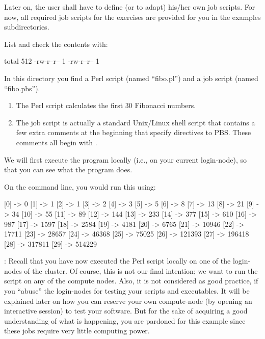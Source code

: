 Later on, the \hpc user shall have to define (or to adapt) his/her own
job scripts. For now, all required job scripts for the
exercises are provided for you in the examples subdirectories.

List and check the contents with:

\begin{prompt}
total 512
-rw-r--r-- 1 %
-rw-r--r-- 1 %
\end{prompt}

In this directory you find a Perl script (named ``fibo.pl'') and a job script
(named ``fibo.pbs'').

\begin{enumerate}
\item  The Perl script calculates the first 30 Fibonacci numbers.
\item  The job script is actually a standard Unix/Linux shell script that
  contains a few extra comments at the beginning that specify directives to
  PBS.  These comments all begin with .
\end{enumerate}

We will first execute the program locally (i.e., on your current login-node),
so that you can see what the program does.

On the command line, you would run this using:

\begin{prompt}
[0] -> 0
[1] -> 1
[2] -> 1
[3] -> 2
[4] -> 3
[5] -> 5
[6] -> 8
[7] -> 13
[8] -> 21
[9] -> 34
[10] -> 55
[11] -> 89
[12] -> 144
[13] -> 233
[14] -> 377
[15] -> 610
[16] -> 987
[17] -> 1597
[18] -> 2584
[19] -> 4181
[20] -> 6765
[21] -> 10946
[22] -> 17711
[23] -> 28657
[24] -> 46368
[25] -> 75025
[26] -> 121393
[27] -> 196418
[28] -> 317811
[29] -> 514229
\end{prompt}

: Recall that you have now executed the Perl script locally on
one of the login-nodes of the \hpc cluster.  Of course, this is not our final
intention; we want to run the script on any of the compute nodes. Also, it is
not considered as good practice, if you ``abuse'' the login-nodes for testing
your scripts and executables. It will be explained later on how you can
reserve your own compute-node (by opening an interactive session) to test
your software. But for the sake of acquiring a good understanding of what is
happening, you are pardoned for this example since these jobs require very little
computing power.


